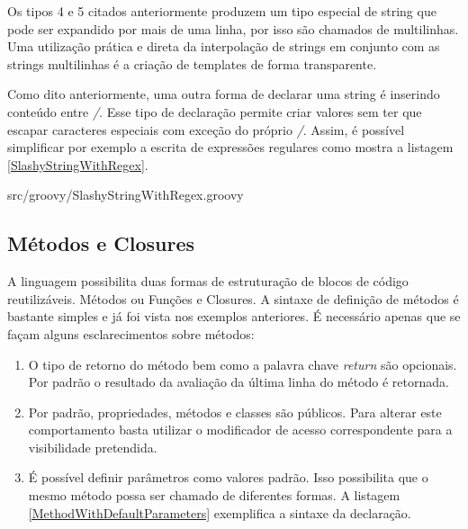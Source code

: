 \documentclass[12pt]{article}
\begin{document}
    Os tipos 4 e 5 citados anteriormente produzem um tipo especial de string que
    pode ser expandido por mais de uma linha, por isso são chamados de multilinhas.
    Uma utilização prática e direta da interpolação de strings em conjunto com as
    strings multilinhas é a criação de templates de forma transparente. 
    
    Como dito anteriormente, uma outra forma de declarar uma string é inserindo
    conteúdo entre \emph{/}. Esse tipo de declaração permite criar valores sem 
    ter que escapar caracteres especiais com exceção do próprio \emph{/}. Assim, 
    é possível simplificar por exemplo a escrita de expressões regulares como 
    mostra a listagem \ref{SlashyStringWithRegex}.
    
    
                    {src/groovy/SlashyStringWithRegex.groovy}

\subsection{Métodos e Closures}

    A linguagem possibilita duas formas de estruturação de blocos de código 
    reutilizáveis. Métodos ou Funções e Closures. A sintaxe de definição de métodos
    é bastante simples e já foi vista nos exemplos anteriores. É necessário apenas
    que se façam alguns esclarecimentos sobre métodos:

    \begin{enumerate}
        \item O tipo de retorno do método bem como a palavra chave \emph{return}
              são opcionais. Por padrão o resultado da avaliação da última linha
              do método é retornada.
        \item Por padrão, propriedades, métodos e classes são públicos. Para alterar
              este comportamento basta utilizar o modificador de acesso correspondente
              para a visibilidade pretendida.
        \item É possível definir parâmetros como valores padrão. Isso possibilita
              que o mesmo método possa ser chamado de diferentes formas. A listagem
              \ref{MethodWithDefaultParameters} exemplifica a sintaxe da declaração.
    \end{enumerate}
    
\end{document}

